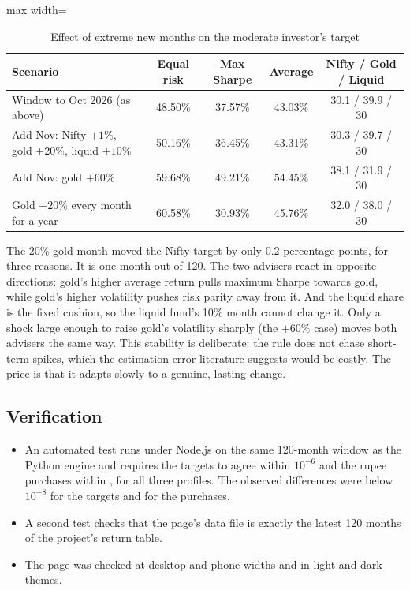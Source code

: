 \begin{table}[H]
\centering
\caption{Effect of extreme new months on the moderate investor's target}
\label{tab:stability}
\small
\begin{adjustbox}{max width=\textwidth}
\begin{tabular}{@{}lcccc@{}}
\toprule
Scenario & Equal risk & Max Sharpe & Average & Nifty / Gold / Liquid \\
\midrule
Window to Oct 2026 (as above) & 48.50\% & 37.57\% & 43.03\% & 30.1 / 39.9 / 30 \\
Add Nov: Nifty $+1\%$, gold $+20\%$, liquid $+10\%$ & 50.16\% & 36.45\% & 43.31\% & 30.3 / 39.7 / 30 \\
Add Nov: gold $+60\%$ & 59.68\% & 49.21\% & 54.45\% & 38.1 / 31.9 / 30 \\
Gold $+20\%$ every month for a year & 60.58\% & 30.93\% & 45.76\% & 32.0 / 38.0 / 30 \\
\bottomrule
\end{tabular}
\end{adjustbox}
\end{table}

The 20\% gold month moved the Nifty target by only 0.2 percentage points, for three reasons. It is
one month out of 120. The two advisers react in opposite directions: gold's higher average return
pulls maximum Sharpe towards gold, while gold's higher volatility pushes risk parity away from it.
And the liquid share is the fixed cushion, so the liquid fund's 10\% month cannot change it. Only a
shock large enough to raise gold's volatility sharply (the $+60\%$ case) moves both advisers the
same way. This stability is deliberate: the rule does not chase short-term spikes, which the
estimation-error literature suggests would be costly. The price is that it adapts slowly to a
genuine, lasting change.

\subsection{Verification}

\begin{itemize}
  \item An automated test runs  under Node.js on the same 120-month window as the Python
        engine and requires the targets to agree within $10^{-6}$ and the rupee purchases within
        , for all three profiles. The observed differences were below $10^{-8}$ for the
        targets and  for the purchases.
  \item A second test checks that the page's data file is exactly the latest 120 months of the
        project's return table.
  \item The page was checked at desktop and phone widths and in light and dark themes.
\end{itemize}

